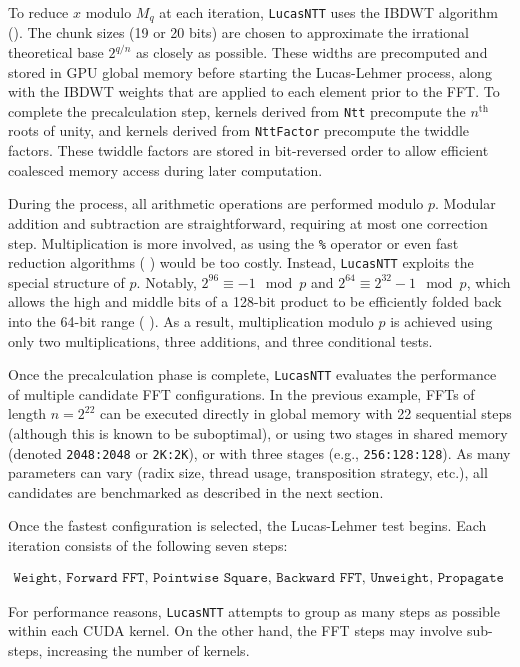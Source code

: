 \documentclass{article}
\begin{document}
To reduce $x$ modulo $M_q$ at each iteration, \texttt{LucasNTT} uses the IBDWT algorithm (\cite{CF94}). The chunk sizes (19 or 20 bits) are chosen to approximate the irrational theoretical base $2^{q/n}$ as closely as possible. These widths are precomputed and stored in GPU global memory before starting the Lucas-Lehmer process, along with the IBDWT weights that are applied to each element prior to the FFT. To complete the precalculation step, kernels derived from \texttt{Ntt} precompute the $n^\text{th}$ roots of unity, and kernels derived from \texttt{NttFactor} precompute the twiddle factors. These twiddle factors are stored in bit-reversed order to allow efficient coalesced memory access during later computation.

During the process, all arithmetic operations are performed modulo $p$. Modular addition and subtraction are straightforward, requiring at most one correction step. Multiplication is more involved, as using the \texttt{\%} operator or even fast reduction algorithms (\cite{Mon85} \cite{Bar87} \cite{Knu81}) would be too costly. Instead, \texttt{LucasNTT} exploits the special structure of $p$. Notably, $2^{96} \equiv -1 \mod p$ and $2^{64} \equiv 2^{32} - 1 \mod p$, which allows the high and middle bits of a 128-bit product to be efficiently folded back into the 64-bit range (\cite{ncw14} \cite{OJS25}). As a result, multiplication modulo $p$ is achieved using only two multiplications, three additions, and three conditional tests.

Once the precalculation phase is complete, \texttt{LucasNTT} evaluates the performance of multiple candidate FFT configurations. In the previous example, FFTs of length $n = 2^{22}$ can be executed directly in global memory with 22 sequential steps (although this is known to be suboptimal), or using two stages in shared memory (denoted \texttt{2048:2048} or \texttt{2K:2K}), or with three stages (e.g., \texttt{256:128:128}). As many parameters can vary (radix size, thread usage, transposition strategy, etc.), all candidates are benchmarked as described in the next section.

Once the fastest configuration is selected, the Lucas-Lehmer test begins. Each iteration consists of the following seven steps:

\begin{align*}
\texttt{Weight, Forward FFT, Pointwise Square, Backward FFT, Unweight, Propagate carry, Minus 2}
\end{align*}

For performance reasons, \texttt{LucasNTT} attempts to group as many steps as possible within each CUDA kernel. On the other hand, the FFT steps may involve sub-steps, increasing the number of kernels.
\end{document}
